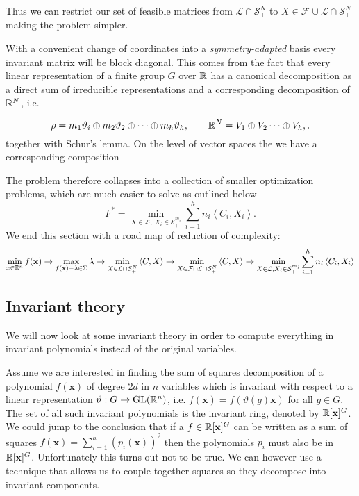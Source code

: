 \documentclass[]{article}
\begin{document}
Thus we can restrict our set of feasible matrices from $\mathcal{L}\cap \mathcal{S}_+^N$ to $ X\in\mathcal{F}\cup\mathcal{L}\cap \mathcal{S}_+^N$ making the problem simpler.

With a convenient change of coordinates into a \textit{symmetry-adapted} basis every invariant matrix will be block diagonal. This comes from the fact that every linear representation of a finite group $G$ over $\mathbb R$ has a canonical decomposition as a direct sum of irreducible representations and a corresponding decomposition of $\mathbb R^N$, i.e.

\[\rho = m_1\vartheta_i\oplus m_2\vartheta_2 \oplus \cdots \oplus m_h\vartheta_h, \quad \quad \mathbb R^N = V_1\oplus V_2 \cdots \oplus V_h,.\]
together with Schur's lemma. 
On the level of vector spaces the we have a corresponding composition


The problem therefore collapses into a collection of smaller 
optimization problems, which are much easier to solve as outlined below 
\[F^\ast = \min_{X\in\mathcal{L},~X_i \in \mathcal{S}_+^{m_i} }\sum_{i=1}^{h} n_i\left<C_i,X_i\right>.\]
We end this section with a road map of reduction of complexity:
\[\min_{x\in\mathbb R^n}f(\mathbf{x}) \rightarrow \max_{f(\mathbf{x})-\lambda\in \Sigma} \lambda \rightarrow\min_{X\in\mathcal{L}\cap \mathcal{S}_+^N } \left<C,X\right> \rightarrow 
\min_{X\in\mathcal{F}\cap\mathcal{L}\cap \mathcal{S}_+^N } \left<C,X\right> \rightarrow
\min_{X\in\mathcal{L}, X_i \in \mathcal{S}_+^{m_i} }\sum_{i=1}^{h} n_i\left<C_i,X_i\right>\]
\subsection*{Invariant theory}
We will now look at some invariant theory in order to compute everything in invariant polynomials instead of the original variables.

Assume we are interested in finding the sum of squares decomposition of a polynomial $f(\textbf{x})$ of degree $2d$ in $n$
variables which is invariant with respect to a linear representation $\vartheta:G\rightarrow \mathrm{GL}(\mathbb R^n)$, i.e. $f(\textbf{x}) = f(\vartheta(g)\textbf{x})$ for all $g\in G$.
The set of all such invariant polynomials is the invariant ring, denoted by $\mathbb R[\textbf{x}]^G$. We could jump to the conclusion that if a $f\in \mathbb R[\textbf{x}]^G$ can be written as a 
sum of squares $f(\textbf{x}) =\sum_{i=1}^{h}(p_i(\textbf{x}))^2$ then the polynomials $p_i$ must also be in $\mathbb R[\mathbf{x}]^G$. Unfortunately this turns out not to be true. We can however
use a technique that allows us to couple together squares so they decompose into invariant components.
\end{document}

